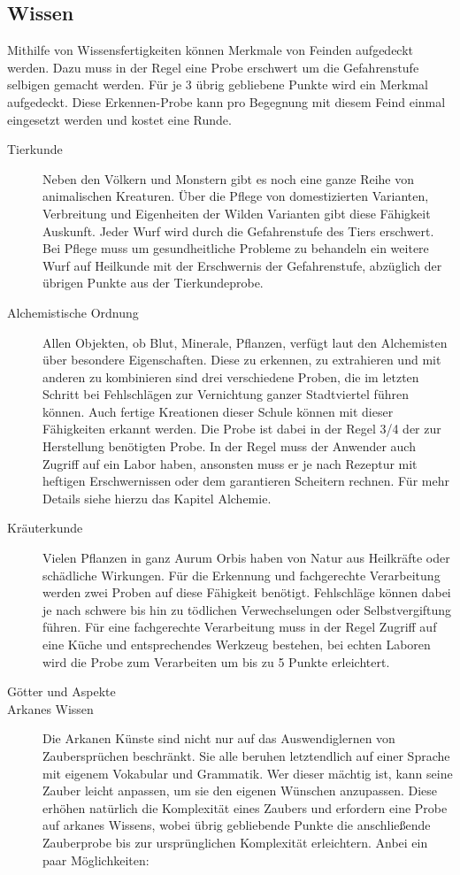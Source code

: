 \documentclass[a4paper,12pt,oneside]{book}
\begin{document}
\subsection{Wissen}
Mithilfe von Wissensfertigkeiten können Merkmale von Feinden aufgedeckt werden. Dazu muss in der Regel eine Probe erschwert um die Gefahrenstufe selbigen gemacht werden. Für je 3 übrig gebliebene Punkte wird ein Merkmal aufgedeckt. Diese Erkennen-Probe kann pro Begegnung mit diesem Feind einmal eingesetzt werden und kostet eine Runde.
\begin{description}
\item[Tierkunde]Neben den Völkern und Monstern gibt es noch eine ganze Reihe von animalischen Kreaturen. Über die Pflege von domestizierten Varianten, Verbreitung und Eigenheiten der Wilden Varianten gibt diese Fähigkeit Auskunft. Jeder Wurf wird durch die Gefahrenstufe des Tiers erschwert. Bei Pflege muss um gesundheitliche Probleme zu behandeln ein weitere Wurf auf Heilkunde mit der Erschwernis der Gefahrenstufe, abzüglich der übrigen Punkte aus der Tierkundeprobe.
\item[Alchemistische Ordnung]Allen Objekten, ob Blut, Minerale, Pflanzen, verfügt laut den Alchemisten über besondere Eigenschaften. Diese zu erkennen, zu extrahieren und mit anderen zu kombinieren sind drei verschiedene Proben, die im letzten Schritt bei Fehlschlägen zur Vernichtung ganzer Stadtviertel führen können. Auch fertige Kreationen dieser Schule können mit dieser Fähigkeiten erkannt werden. Die Probe ist dabei in der Regel 3/4 der zur Herstellung benötigten Probe. In der Regel muss der Anwender auch Zugriff auf ein Labor haben, ansonsten muss er je nach Rezeptur mit heftigen Erschwernissen oder dem garantieren Scheitern rechnen. Für mehr Details siehe hierzu das Kapitel Alchemie.
\item[Kräuterkunde]Vielen Pflanzen in ganz Aurum Orbis haben von Natur aus Heilkräfte oder schädliche Wirkungen. Für die Erkennung und fachgerechte Verarbeitung werden zwei Proben auf diese Fähigkeit benötigt. Fehlschläge können dabei je nach schwere bis hin zu tödlichen Verwechselungen oder Selbstvergiftung führen. Für eine fachgerechte Verarbeitung muss in der Regel Zugriff auf eine Küche und entsprechendes Werkzeug bestehen, bei echten Laboren wird die Probe zum Verarbeiten um bis zu 5 Punkte erleichtert. 
\item[Götter und Aspekte]
\item[Arkanes Wissen]Die Arkanen Künste sind nicht nur auf das Auswendiglernen von Zaubersprüchen beschränkt. Sie alle beruhen letztendlich auf einer Sprache mit eigenem Vokabular und Grammatik. Wer dieser mächtig ist, kann seine Zauber leicht anpassen, um sie den eigenen Wünschen anzupassen. Diese erhöhen natürlich die Komplexität eines Zaubers und erfordern eine Probe auf arkanes Wissens, wobei übrig gebliebende Punkte die anschließende Zauberprobe bis zur ursprünglichen Komplexität erleichtern. Anbei ein paar Möglichkeiten:

\end{description}
\end{document}
